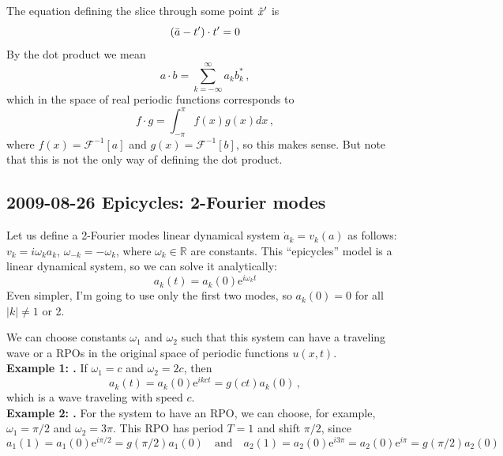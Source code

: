 The equation defining the slice through some point ${\hat{x}'}$ is
\[ (\bar{a} - t'_{}) \cdot t'_{} = 0 \]
By the dot product we mean
\[ a \cdot b = \sum_{k=-\infty}^\infty a_k b_k^*\,, \]
which in the space of real periodic functions corresponds to
\[ f \cdot g = \int_{-\pi}^\pi f(x) g(x) dx\,, \]
where $f(x) = \mathcal{F}^{-1}[a]$ and $g(x) = \mathcal{F}^{-1}[b]$,
so this makes sense.  But note that this is not
the only way of defining the dot product.

\subsection{2009-08-26 Epicycles: 2-Fourier modes}
\label{sect:epyc2Fourier}

\medskip{}
Let us define a 2-Fourier modes linear dynamical system
$\dot{a}_k = v_k(a)$ as follows: $v_k = i \omega_k a_k$,
$\omega_{-k} = -\omega_k$, where $\omega_k \in \mathbb{R}$ are
constants.
This
     {``epicycles'' model}
is a linear dynamical system, so we can solve it analytically:
\[ a_k(t) = a_k(0) \mathrm{e}^{i \omega_k t} \]
Even simpler, I'm going to use only the first two modes, so $a_k(0) = 0$ for all $|k| \neq 1$ or 2.

We can choose constants $\omega_1$ and $\omega_2$ such that this system can have
a traveling wave or a RPOs in the original space of periodic functions $u(x,t)$.\\
{\bf Example 1: \Reqv.} If $\omega_1 = c$ and $\omega_2 = 2c$, then
\[ a_k(t) = a_k(0) \mathrm{e}^{ikct} = g(ct) a_k(0)\,, \]
which is a wave traveling with speed $c$.\\
{\bf Example 2: \Rpo.} For the system to have an RPO, we can choose, for example,
$\omega_1 = \pi/2$ and $\omega_2 = 3\pi$.  This RPO has period $T = 1$ and shift $\pi/2$, since
\[ a_1(1) = a_1(0) \mathrm{e}^{i\pi/2} = g(\pi/2) a_1(0) \quad \mathrm{and} \quad
   a_2(1) = a_2(0) \mathrm{e}^{i3\pi} = a_2(0) \mathrm{e}^{i\pi} = g(\pi/2) a_2(0) \]

